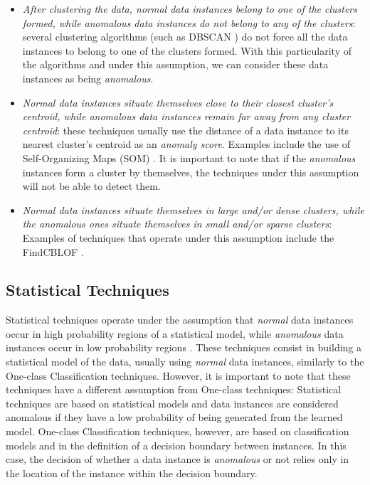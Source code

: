 \begin{itemize}
	\item \textit{After clustering the data, \textit{normal} data instances belong to one of the clusters formed, while \textit{anomalous} data instances do not belong to any of the clusters}: several clustering algorithms (such as DBSCAN \cite{Ester:1996:DAD:3001460.3001507}) do not force all the data instances to belong to one of the clusters formed. With this particularity of the algorithms and under this assumption, we can consider these data instances as being \textit{anomalous}.
	
	\item \textit{\textit{Normal} data instances situate themselves close to their closest cluster's centroid, while \textit{anomalous} data instances remain far away from any cluster centroid}: these techniques usually use the distance of a data instance to its nearest cluster's centroid as an \textit{anomaly score}. Examples include the use of Self-Organizing Maps (SOM) \cite{Kohonen:1997:SM:261082}.
	It is important to note that if the \textit{anomalous} instances form a cluster by themselves, the techniques under this assumption will not be able to detect them.
	
	\item \textit{\textit{Normal} data instances situate themselves in large and/or dense clusters, while the \textit{anomalous} ones situate themselves in small and/or sparse clusters}: Examples of techniques that operate under this assumption include the FindCBLOF \cite{He:2003:DCL:770340.770389}.
\end{itemize}

\subsection{Statistical Techniques}

Statistical techniques operate under the assumption that \textit{normal} data instances occur in high probability regions of a statistical model, while \textit{anomalous} data instances occur in low probability regions \cite{Kandhari2009}.
These techniques consist in building a statistical model of the data, usually using \textit{normal} data instances, similarly to the One-class Classification techniques. However, it is important to note that these techniques have a different assumption from One-class techniques: Statistical techniques are based on statistical models and data instances are considered anomalous if they have a low probability of being generated from the learned model. One-class Classification techniques, however, are based on classification models and in the definition of a decision boundary between instances. In this case, the decision of whether a data instance is \textit{anomalous} or not relies only in the location of the instance within the decision boundary.

